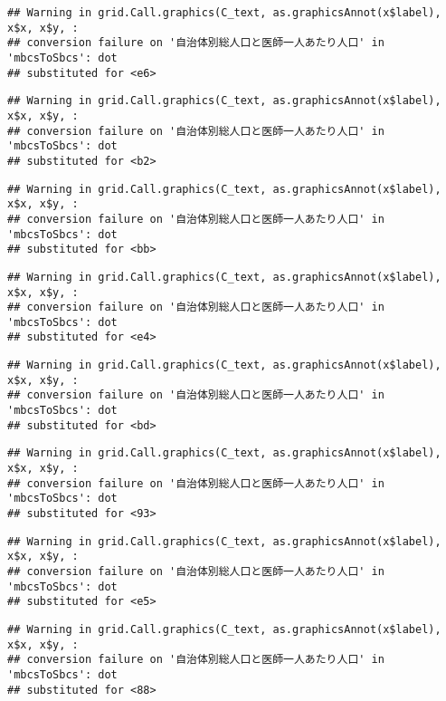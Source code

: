 \documentclass[
]{article}
\begin{document}
\begin{verbatim}
## Warning in grid.Call.graphics(C_text, as.graphicsAnnot(x$label), x$x, x$y, :
## conversion failure on '自治体別総人口と医師一人あたり人口' in 'mbcsToSbcs': dot
## substituted for <e6>
\end{verbatim}

\begin{verbatim}
## Warning in grid.Call.graphics(C_text, as.graphicsAnnot(x$label), x$x, x$y, :
## conversion failure on '自治体別総人口と医師一人あたり人口' in 'mbcsToSbcs': dot
## substituted for <b2>
\end{verbatim}

\begin{verbatim}
## Warning in grid.Call.graphics(C_text, as.graphicsAnnot(x$label), x$x, x$y, :
## conversion failure on '自治体別総人口と医師一人あたり人口' in 'mbcsToSbcs': dot
## substituted for <bb>
\end{verbatim}

\begin{verbatim}
## Warning in grid.Call.graphics(C_text, as.graphicsAnnot(x$label), x$x, x$y, :
## conversion failure on '自治体別総人口と医師一人あたり人口' in 'mbcsToSbcs': dot
## substituted for <e4>
\end{verbatim}

\begin{verbatim}
## Warning in grid.Call.graphics(C_text, as.graphicsAnnot(x$label), x$x, x$y, :
## conversion failure on '自治体別総人口と医師一人あたり人口' in 'mbcsToSbcs': dot
## substituted for <bd>
\end{verbatim}

\begin{verbatim}
## Warning in grid.Call.graphics(C_text, as.graphicsAnnot(x$label), x$x, x$y, :
## conversion failure on '自治体別総人口と医師一人あたり人口' in 'mbcsToSbcs': dot
## substituted for <93>
\end{verbatim}

\begin{verbatim}
## Warning in grid.Call.graphics(C_text, as.graphicsAnnot(x$label), x$x, x$y, :
## conversion failure on '自治体別総人口と医師一人あたり人口' in 'mbcsToSbcs': dot
## substituted for <e5>
\end{verbatim}

\begin{verbatim}
## Warning in grid.Call.graphics(C_text, as.graphicsAnnot(x$label), x$x, x$y, :
## conversion failure on '自治体別総人口と医師一人あたり人口' in 'mbcsToSbcs': dot
## substituted for <88>
\end{verbatim}
\end{document}
